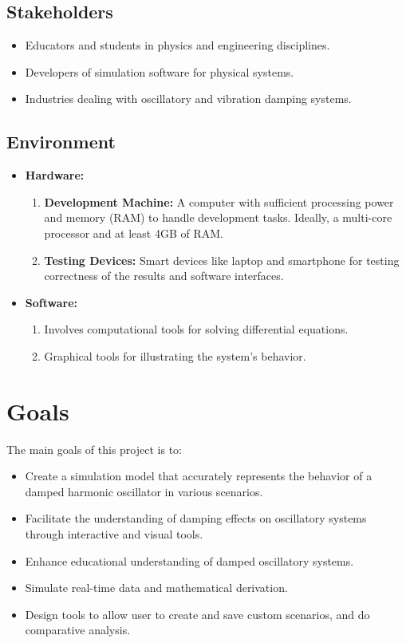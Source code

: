 \documentclass{article}
\begin{document}
\subsection{Stakeholders}

\begin{itemize}
    \item Educators and students in physics and engineering disciplines.
    \item Developers of simulation software for physical systems.
    \item Industries dealing with oscillatory and vibration damping systems.
\end{itemize}

\subsection{Environment}

\begin{itemize}
    \item \textbf{Hardware:} \begin{enumerate}
        \item \textbf{Development Machine:} A computer with sufficient processing power and memory (RAM) to handle development tasks. Ideally, a multi-core processor and at least 4GB of RAM.
        \item \textbf{Testing Devices:} Smart devices like laptop and smartphone for testing correctness of the results and software interfaces.
    \end{enumerate}

    \item \textbf{Software:} \begin{enumerate}
        \item Involves computational tools for solving differential equations.
        \item Graphical tools for illustrating the system's behavior.
    \end{enumerate}
\end{itemize}

\section{Goals}
The main goals of this project is to:
\begin{itemize}
    \item Create a simulation model that accurately represents the behavior of a damped harmonic oscillator in various scenarios.
    \item Facilitate the understanding of damping effects on oscillatory systems through interactive and visual tools.
    \item Enhance educational understanding of damped oscillatory systems.
    \item Simulate real-time data and mathematical derivation.
    \item Design tools to allow user to create and save custom scenarios, and do comparative analysis.
\end{itemize}
\end{document}
